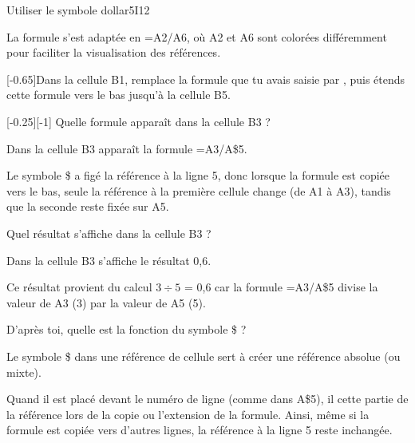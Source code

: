 \begin{EXO}{Utiliser le symbole dollar}{5I12}
\begin{MultiColonnes}{2}
\begin{tcbenumerate}[1][3]
\begin{crep}[extra lines=1]
        La formule s'est adaptée en =A2/A6, où A2 et A6 sont colorées différemment pour faciliter la visualisation des références.
        \end{crep}
    \end{tcbenumerate}
\end{MultiColonnes}

\begin{MultiColonnes}{2}
\tcbitem[raster multicolumn=2]
    \begin{tcbenumerate}[1][6]
        \tcbitem {}[-0.65]Dans la cellule B1, remplace la formule que tu avais saisie par , puis étends cette formule vers le bas jusqu'à la cellule B5. 
        
        [-0.25][-1] Quelle formule apparaît dans la cellule B3 ?
        \begin{crep}[extra lines=1]
        Dans la cellule B3 apparaît la formule =A3/A\$5.
        
        Le symbole \$ a figé la référence à la ligne 5, donc lorsque la formule est copiée vers le bas, seule la référence à la première cellule change (de A1 à A3), tandis que la seconde reste fixée sur A5.
        \end{crep}
        
        \tcbitem {}Quel résultat s'affiche dans la cellule B3 ?
        \begin{crep}[extra lines=1]
        Dans la cellule B3 s'affiche le résultat 0,6.
        
        Ce résultat provient du calcul $3 \div 5$ = 0,6 car la formule =A3/A\$5 divise la valeur de A3 (3) par la valeur de A5 (5).
        \end{crep}
    \end{tcbenumerate}

\tcbitem[raster multicolumn=2]
    \begin{tcbenumerate}[1][8]
        \tcbitem {}D'après toi, quelle est la fonction du symbole \$ ?
        \begin{crep}[extra lines=2]
        Le symbole \$ dans une référence de cellule sert à créer une référence absolue (ou mixte).
        
        Quand il est placé devant le numéro de ligne (comme dans A\$5), il  cette partie de la référence lors de la copie ou l'extension de la formule. Ainsi, même si la formule est copiée vers d'autres lignes, la référence à la ligne 5 reste inchangée.
        

\end{crep}
\end{tcbenumerate}
\end{MultiColonnes}
\end{EXO}
